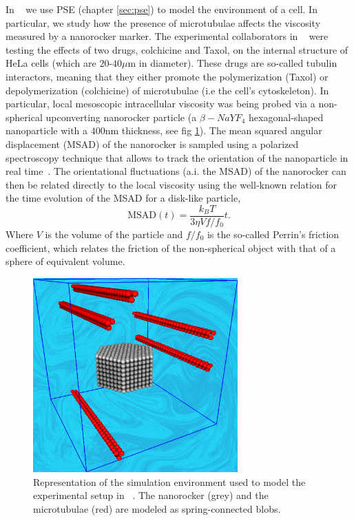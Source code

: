 \documentclass[twoside,openright,titlepage,numbers=noenddot,%
headinclude,footinclude,cleardoublepage=empty,abstract=on,
BCOR=5mm,fontsize=11pt, dvipsnames, paper=b5
]{scrreprt}
\newcommand{\kT}{k_B T}
\begin{document}
In ~\cite{Pelaez2019} we use \gls{PSE} (chapter \ref{sec:pse}) to model the environment of a cell. In particular, we study how the presence of microtubulae affects the viscosity measured by a nanorocker marker.
The experimental collaborators in ~\cite{Pelaez2019} were testing the effects of two drugs, colchicine and Taxol, on the internal structure of HeLa cells (which are $20$-$40\mu$m in diameter). These drugs are so-called tubulin interactors, meaning that they either promote the polymerization (Taxol) or depolymerization (colchicine) of microtubulae (i.e the cell's cytoskeleton).
In particular, local mesoscopic intracellular viscosity was being probed via a non-spherical upconverting nanorocker particle (a $\beta-NaYF_4$ hexagonal-shaped nanoparticle with a $400$nm thickness, see fig \ref{fig:cellvis}). The mean squared angular displacement (MSAD) of the nanorocker is sampled using a polarized spectroscopy technique that allows to track the orientation of the nanoparticle in real time~\cite{RodriguezSevilla2016}.
The orientational fluctuations (a.i. the MSAD) of the nanorocker can then be related directly to the local viscosity using the well-known relation for the time evolution of the MSAD for a disk-like particle,
\begin{equation}
  \label{eq:msad}
  \text{MSAD}(t) = \frac{\kT}{3\eta V f/f_0}t.
\end{equation}
Where $V$ is the volume of the particle and $f/f_0$ is the so-called Perrin's friction coefficient, which relates the friction of the non-spherical object with that of a sphere of equivalent volume. 
\begin{figure}[H]
  \centering
  \includegraphics[width=0.7\textwidth]{gfx/hexagon}
  \caption[ ]{Representation of the simulation environment used to model the experimental setup in ~\cite{Pelaez2019}. The nanorocker (grey) and the microtubulae (red) are modeled as spring-connected blobs.}
  \label{fig:cellvis}
\end{figure}
\end{document}
